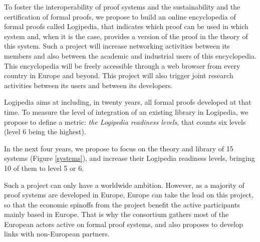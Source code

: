 To foster the interoperability of proof systems and the sustainability
and the certification of formal proofs, we propose to build an online
encyclopedia of formal proofs called {\sc Logipedia}, that indicates
which proof can be used in which system and, when it is the case,
provides a version of the proof in the theory of this system.  Such a
project will increase networking activities between its members and
also between the academic and industrial users of this encyclopedia.
This encyclopedia will be freely accessible through a web browser from
every country in Europe and beyond. This project will also trigger
joint research activities between its users and between its
developers.

{\sc Logipedia} aims at including, in twenty years, all formal proofs
developed at that time. To measure the level of integration of an
existing library in {\sc Logipedia}, we propose to define a metric:
{\em the {\sc Logipedia} readiness levels}, that counts six levels
(level 6 being the highest).

In the next four years, we propose to focus on the theory and library
of 15 systems (Figure \ref{systems}), and increase their {\sc
  Logipedia} readiness levels, bringing 10 of them to level 5 or 6.

Such a project can only have a worldwide ambition. However, as a
majority of proof systems are developed in Europe, Europe can take the
lead on this project, so that the economic spinoffs from the project
benefit the active participants mainly based in Europe.  That is why
the consortium gathers most of the European actors active on formal
proof systems, and also proposes to develop links with non-European
partners.


